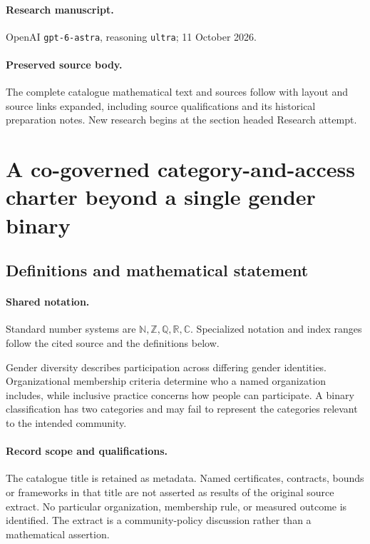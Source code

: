 \documentclass[11pt]{article}
\begin{document}
\paragraph{Research manuscript.} OpenAI \texttt{gpt-6-astra}, reasoning \texttt{ultra}; 11 October 2026.
\paragraph{Preserved source body.} The complete catalogue mathematical text and sources follow with layout and source links expanded, including source qualifications and its historical preparation notes. New research begins at the section headed Research attempt.

\section{A co-governed category-and-access charter beyond a single gender binary}\label{statement}

\subsection{Definitions and mathematical statement}

\paragraph{Shared notation.}Standard number systems are $\mathbb N,\mathbb Z,\mathbb Q,\mathbb R,\mathbb C$. Specialized notation and index ranges follow the cited source and the definitions below.


Gender diversity describes participation across differing gender identities. Organizational membership criteria determine who a named organization includes, while inclusive practice concerns how people can participate. A binary classification has two categories and may fail to represent the categories relevant to the intended community.
\paragraph{Record scope and qualifications.}
The catalogue title is retained as metadata. Named certificates, contracts, bounds or frameworks in that title are not asserted as results of the original source extract.
No particular organization, membership rule, or measured outcome is identified. The extract is a community-policy discussion rather than a mathematical assertion.
\end{document}

